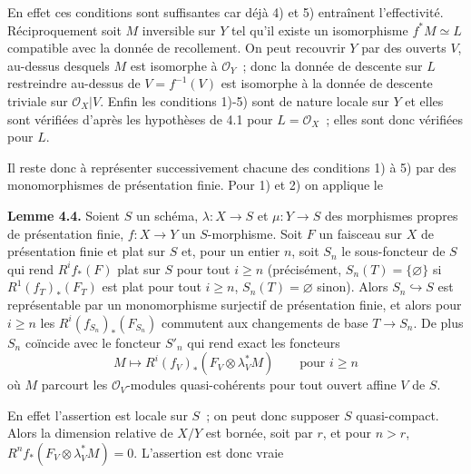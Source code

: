 En
effet ces conditions sont suffisantes car déjà 4) et 5) entraînent l'effectivité. Réciproquement soit \(M\) inversible sur \(Y\) tel qu'il existe un isomorphisme \(f^*M\simeq L\) compatible avec la donnée de recollement. On peut recouvrir \(Y\) par des ouverts \(V\), au-dessus desquels \(M\) est isomorphe à \(\mathcal O_Y\)~; donc la donnée de descente sur \(L\) restreindre au-dessus de \(V=f^{-1}(V)\) est isomorphe à la donnée de descente triviale sur \(\mathcal O_X|V\). Enfin les conditions 1)-5) sont de nature locale sur \(Y\) et elles sont vérifiées d'après les hypothèses de 4.1 pour \(L=\mathcal O_X\)~; elles sont donc vérifiées pour \(L\).

Il reste donc à représenter successivement chacune des conditions 1) à 5) par des monomorphismes de présentation finie. Pour 1) et 2) on applique le

\textbf{Lemme 4.4.} Soient \(S\) un schéma, \(\lambda:X\to S\) et \(\mu:Y\to S\) des morphismes propres de présentation finie, \(f:X\to Y\) un \(S\)-morphisme. Soit \(F\) un faisceau sur \(X\) de présentation finie et plat sur \(S\) et, pour un entier \(n\), soit \(S_n\) le sous-foncteur de \(S\) qui rend \(R^if_*(F)\) plat sur \(S\) pour tout \(i\ge n\) (précisément, \(S_n(T)=\{\varnothing\}\) si \(R^1(f_T)_*(F_T)\) est plat pour tout \(i\ge n\), \(S_n(T)=\varnothing\) sinon). Alors \(S_n\hookrightarrow S\) est représentable par un monomorphisme surjectif de présentation finie, et alors pour \(i\ge n\) les \(R^i(f_{S_n})_*(F_{S_n})\) commutent aux changements de base \(T\to S_n\). De plus \(S_n\) coïncide avec le foncteur \(S'_n\) qui rend exact les foncteurs
\[
  M\longmapsto R^i(f_V)_*(F_V\otimes\lambda_V^*M)\qquad \text{pour } i\ge n
\]
où \(M\) parcourt les \(\mathcal O_V\)-modules quasi-cohérents pour tout ouvert affine \(V\) de \(S\).

En effet l'assertion est locale sur \(S\)~; on peut donc supposer \(S\) quasi-compact. Alors la dimension relative de \(X/Y\) est bornée, soit par \(r\), et pour \(n>r\), \(R^nf_*(F_V\otimes\lambda_V^*M)=0\). L'assertion est donc vraie
